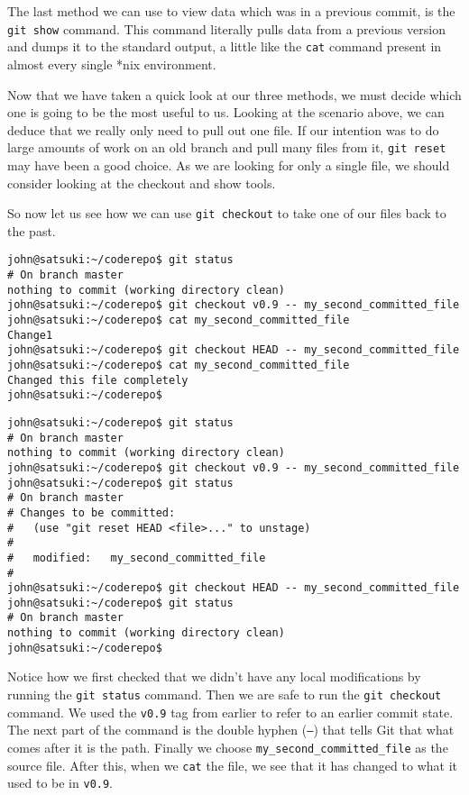 The last method we can use to view data which was in a previous commit, is the \texttt{git show} command.  This command literally pulls data from a previous version and dumps it to the standard output, a little like the \texttt{cat} command present in almost every single *nix environment.

Now that we have taken a quick look at our three methods, we must decide which one is going to be the most useful to us.  Looking at the scenario above, we can deduce that we really only need to pull out one file.  If our intention was to do large amounts of work on an old branch and pull many files from it, \texttt{git reset} may have been a good choice.  As we are looking for only a single file, we should consider looking at the checkout and show tools.

So now let us see how we can use \texttt{git checkout} to take one of our files back to the past.

\begin{Verbatim}
john@satsuki:~/coderepo$ git status
# On branch master
nothing to commit (working directory clean)
john@satsuki:~/coderepo$ git checkout v0.9 -- my_second_committed_file
john@satsuki:~/coderepo$ cat my_second_committed_file 
Change1
john@satsuki:~/coderepo$ git checkout HEAD -- my_second_committed_file
john@satsuki:~/coderepo$ cat my_second_committed_file 
Changed this file completely
john@satsuki:~/coderepo$ 
\end{Verbatim}

\begin{Verbatim}
john@satsuki:~/coderepo$ git status
# On branch master
nothing to commit (working directory clean)
john@satsuki:~/coderepo$ git checkout v0.9 -- my_second_committed_file
john@satsuki:~/coderepo$ git status
# On branch master
# Changes to be committed:
#   (use "git reset HEAD <file>..." to unstage)
#
#	modified:   my_second_committed_file
#
john@satsuki:~/coderepo$ git checkout HEAD -- my_second_committed_file
john@satsuki:~/coderepo$ git status
# On branch master
nothing to commit (working directory clean)
john@satsuki:~/coderepo$ 
\end{Verbatim}

Notice how we first checked that we didn't have any local modifications by running the \texttt{git status} command.  Then we are safe to run the \texttt{git checkout} command.  We used the \texttt{v0.9} tag from earlier to refer to an earlier commit state.  The next part of the command is the double hyphen (\texttt{--}) that tells Git that what comes after it is the path.  Finally we choose \texttt{my\_second\_committed\_file} as the source file.  After this, when we \texttt{cat} the file, we see that it has changed to what it used to be in \texttt{v0.9}.

